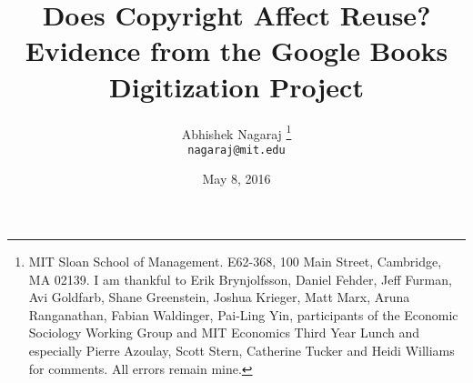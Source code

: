 \documentclass[11pt]{article}
\begin{document}
\setlength{\parskip}{4.5pt}

\baselineskip 18.5pt

\title{Does Copyright Affect Reuse?\\ Evidence from the Google Books Digitization Project}



\author{Abhishek Nagaraj \footnote{MIT Sloan School of Management. E62-368, 100 Main Street, Cambridge, MA 02139. I am thankful to Erik Brynjolfsson, Daniel Fehder, Jeff Furman, Avi Goldfarb, Shane Greenstein, Joshua Krieger, Matt Marx, Aruna Ranganathan, Fabian Waldinger, Pai-Ling Yin, participants of the Economic Sociology Working Group and MIT Economics Third Year Lunch and especially Pierre Azoulay, Scott Stern, Catherine Tucker and Heidi Williams for comments. All errors remain mine.}
\\         \texttt{nagaraj@mit.edu}   
}

\date{May 8, 2016}

\maketitle
\thispagestyle{empty}
\end{document}

